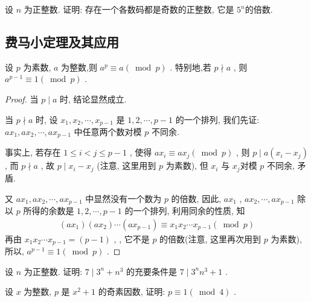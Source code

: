 \documentclass[aspectratio=169]{ctexbeamer}
\theoremstyle{definition}
\begin{document}
\begin{frame}[t]
\begin{example}
	设 $n$ 为正整数. 证明: 存在一个各数码都是奇数的正整数, 它是 $5^{n}$的倍数.
\end{example}
\end{frame}

\subsection{费马小定理及其应用}\setcounter{theorem}{0}
\begin{frame}
\begin{theorem}
	设 $p$ 为素数, $a$ 为整数,则 $a^{p} \equiv a(\bmod p)$ . 特别地,若 $p \nmid a$ , 则 $a^{p-1} \equiv 1(\bmod p)$ .
\end{theorem}
\pause
\begin{proof}
	当 $p \mid a$ 时, 结论显然成立.

	当 $p \nmid a$ 时, 设 $x_{1}, x_{2}, \cdots, x_{p-1}$ 是 $1,2, \cdots, p-1$ 的一个排列, 我们先证:  $a x_{1}, a x_{2}, \cdots, a x_{p-1}$ 中任意两个数对模 $p$ 不同余.

	事实上, 若存在 $1 \leqslant i<j \leqslant p-1$ , 使得 $a x_{i} \equiv a x_{j}(\bmod p)$ , 则 $p \mid a\left(x_{i}-x_{j}\right)$ , 而 $p \nmid a$ , 故 $p \mid x_{i}-x_{j}$ (注意, 这里用到 $p$ 为素数), 但 $x_{i}$ 与 $x_{j}$对模 $p$ 不同余, 矛盾.

	又 $a x_{1}, a x_{2}, \cdots, a x_{p-1}$ 中显然没有一个数为 $p$ 的倍数, 因此,  $a x_{1}$ ,  $a x_{2}, \cdots, a x_{p-1}$ 除以 $p$ 所得的余数是 $1,2, \cdots, p-1$ 的一个排列, 利用同余的性质, 知
	\begin{align*}
		\left(a x_{1}\right)\left(a x_{2}\right) \cdots\left(a x_{p-1}\right) \equiv x_{1} x_{2} \cdots x_{p-1}(\bmod p)
	\end{align*}
	再由 $x_{1} x_{2} \cdots x_{p-1}=(p-1)$ , , 它不是 $p$ 的倍数(注意, 这里再次用到 $p$ 为素数), 所以,  $a^{p-1} \equiv 1(\bmod p)$ .
\end{proof}
\end{frame}

\begin{frame}[t]
\begin{example}
	设 $n$ 为正整数. 证明: $7 \mid 3^{n}+n^{3}$ 的充要条件是 $7 \mid 3^{n} n^{3}+1$ .
\end{example}
\end{frame}

\begin{frame}[t]
\begin{example}
	设 $x$ 为整数,  $p$ 是 $x^{2}+1$ 的奇素因数, 证明:  $p \equiv 1(\bmod 4)$ .
\end{example}
\end{frame}
\end{document}
